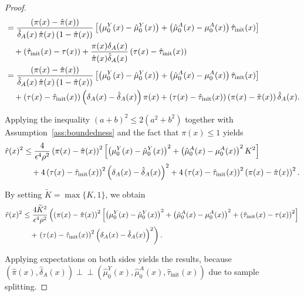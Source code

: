 \documentclass{article} %
\newcommand{\indep}{\perp \!\!\! \perp}
\theoremstyle{definition}
\theoremstyle{plain}
\begin{document}
\begin{proof}
\begin{align}
   &=\frac{\left(\pi(x) - \hat{\pi}(x) \right)}{\hat{\delta}_A(x) \, \hat{\pi}(x) \left(1 - \hat{\pi}(x)\right)}\left[\left(\mu_0^Y(x) - \hat{\mu}_0^Y(x)\right) + \left(\hat{\mu}_0^A(x) - \mu_0^A(x)\right)\hat{\tau}_{\mathrm{init}}(x)\right] \notag \\
   & \quad + \left(\hat{\tau}_{\mathrm{init}}(x) - \tau(x)\right) + \frac{\pi(x) \delta_A(x)}{\hat{\pi}(x) \hat{\delta}_A(x)} \left(\tau(x) - \hat{\tau}_{\mathrm{init}}(x)\right) \\
   &= \frac{\left(\pi(x) - \hat{\pi}(x) \right)}{\hat{\delta}_A(x) \, \hat{\pi}(x) \left(1 - \hat{\pi}(x)\right)}\left[\left(\mu_0^Y(x) - \hat{\mu}_0^Y(x)\right) + \left(\hat{\mu}_0^A(x) - \mu_0^A(x)\right)\hat{\tau}_{\mathrm{init}}(x)\right] \notag \\
   & \quad + \left(\tau(x) - \hat{\tau}_{\mathrm{init}}(x)\right) \left(\delta_A(x) - \hat{\delta}_A(x)\right) \pi(x) + \left(\tau(x) - \hat{\tau}_{\mathrm{init}}(x)\right) \left(\pi(x) - \hat{\pi}(x)\right) \hat{\delta}_A(x).
\end{align}

Applying the inequality $(a+b)^2 \leq 2(a^2 + b^2)$ together with Assumption~\ref*{ass:boundedness} and the fact that $\pi(x) \leq 1$ yields
\begin{align}
    \hat{r}(x)^2 & \leq \frac{4}{\epsilon^4 \rho^2} \left(\pi(x) - \hat{\pi}(x) \right)^2 \left[\left(\mu_0^Y(x) - \hat{\mu}_0^Y(x)\right)^2 + \left(\hat{\mu}_0^A(x) - \mu_0^A(x)\right)^2 K^2\right] \notag\\
    & \quad +4 \left(\tau(x) - \hat{\tau}_{\mathrm{init}}(x)\right)^2 \left(\delta_A(x) - \hat{\delta}_A(x)\right)^2 + 4\left(\tau(x) - \hat{\tau}_{\mathrm{init}}(x)\right)^2 \left(\pi(x) - \hat{\pi}(x)\right)^2 .
\end{align}

By setting $\widetilde{K} = \max\{K,1\}$, we obtain
\begin{align}
    \hat{r}(x)^2 & \leq \frac{4\widetilde{K}^2}{\epsilon^4 \rho^2}\left( \left(\pi(x) - \hat{\pi}(x) \right)^2 \left[\left(\mu_0^Y(x) - \hat{\mu}_0^Y(x)\right)^2 + \left(\hat{\mu}_0^A(x) - \mu_0^A(x)\right)^2 + \left(\hat{\tau}_{\mathrm{init}}(x) - \tau(x)\right)^2\right] \right. \notag\\
    & \quad + \left. \left(\tau(x) - \hat{\tau}_{\mathrm{init}}(x)\right)^2 \left(\delta_A(x) - \hat{\delta}_A(x)\right)^2 \right).
\end{align}

Applying expectations on both sides yields the results, because $(\hat{\pi}(x), \hat{\delta}_A(x)) \indep (\hat{\mu}_0^Y(x), \hat{\mu}_0^A(x), \hat{\tau}_{\mathrm{init}}(x))$ due to sample splitting.
\end{proof}
\end{document}
